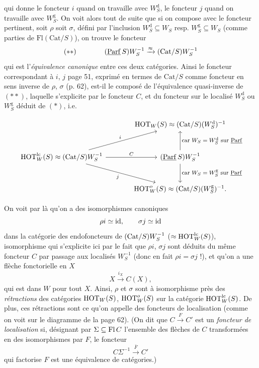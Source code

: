 qui donne le foncteur $i$ quand on travaille avec $W_S^{\mathrm{d}}$, le foncteur $j$ quand on travaille avec $W_S^{\mathrm{g}}$. On voit alors tout de suite que si on compose avec le foncteur pertinent, soit $\rho$ soit $\sigma$, défini par l'inclusion $W_S^{\mathrm{d}} \subseteq W_S$ resp. $W_S^{\mathrm{g}} \subseteq W_S$ (comme parties de $\mathrm{Fl}(\mathrm{Cat}/S)$), on trouve le foncteur
\[(**) \qquad\qquad (\underline{\mathrm{Parf}}\,S)W_S^{-1} \xrightarrow{\approx} (\mathrm{Cat}/S)W_S^{-1}\]
qui est l'\textit{équivalence canonique} entre ces deux catégories. Ainsi le foncteur correspondant à $i$, $j$ page 51, exprimé en termes de $\mathrm{Cat}/S$ comme foncteur en sens inverse de $\rho$, $\sigma$ (p. 62), est-il le composé de l'équivalence quasi-inverse de $(**)$, laquelle s'explicite par le foncteur $C$, et du foncteur sur le localisé $W_S^{\mathrm{d}}$ ou $W_S^{\mathrm{g}}$ déduit de $(*)$, i.e.


\[
\begin{tikzcd}[column sep=large, row sep=large]
 & \HOT_W(S)\approx(\Cat/S)(W_S^{\mathrm{d}})^{-1} \\
\HOT^{\mathrm{lc}}_W(S)\approx(\Cat/S)W_S^{-1} \arrow[ur, "i"] \arrow[r, "C"] \arrow[dr, "j"'] & (\ul{Parf}\,S)W_S^{-1} \arrow[u, "\text{\footnotesize car $W_S=W_S^{\mathrm{d}}$ sur $\ul{Parf}$}"'] \arrow[d, "\text{\footnotesize car $W_S=W_S^{\mathrm{g}}$ sur $\ul{Parf}$}"] \\
 & \HOT^{o}_W(S)\approx(\Cat/S)(W_S^{\mathrm{g}})^{-1}.
\end{tikzcd}
\]

On voit par là qu'on a des isomorphismes canoniques
\[
\rho i\simeq\mathrm{id},\qquad\sigma j\simeq\mathrm{id}
\]
dans la catégorie des endofoncteurs de $(\mathrm{Cat}/S)W_S^{-1}$ ($\approx\mathrm{HOT}^{\mathrm{lc}}_W(S)$), isomorphisme qui s'explicite ici par le fait que $\rho i$, $\sigma j$ sont déduits du même foncteur $C$ par passage aux localisés $W_S^{-1}$ (donc en fait $\rho i=\sigma j$ !), et qu'on a une flèche fonctorielle en $X$
\[
X\xrightarrow{i_X}C(X),
\]
qui est dans $W$ pour tout $X$. Ainsi, $\rho$ et $\sigma$ sont à isomorphisme près des \textit{rétractions} des catégories $\mathrm{HOT}_W(S)$, $\mathrm{HOT}^{o}_W(S)$ sur la catégorie $\mathrm{HOT}^{\mathrm{lc}}_W(S)$. De plus, ces rétractions sont ce qu'on appelle des foncteurs de localisation (comme on voit sur le diagramme de la page 62). (On dit que $C\xrightarrow{F}C'$ est un \textit{foncteur de localisation} si, désignant par $\Sigma\subseteq\mathrm{Fl}\,C$ l'ensemble des flèches de $C$ transformées en des isomorphismes par $F$, le foncteur
\[
C\Sigma^{-1}\xrightarrow{\bar{F}}C'
\]
qui factorise $F$ est une équivalence de catégories.)


